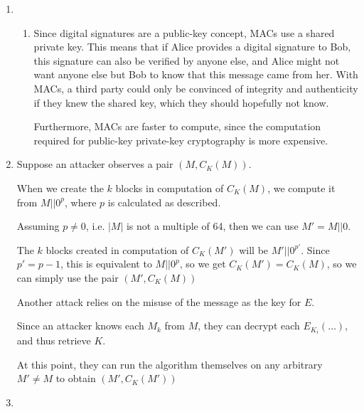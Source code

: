 


\begin{enumerate}[label=(\alph*)]

  \item
    \begin{enumerate}[label=(\roman*)]

      \item

        Since digital signatures are a public-key concept, MACs use a shared private key. This means that if Alice provides a digital signature to Bob, this signature can also be verified by anyone else, and Alice might not want anyone else but Bob to know that this message came from her. With MACs, a third party could only be convinced of integrity and authenticity if they knew the shared key, which they should hopefully not know.

        Furthermore, MACs are faster to compute, since the computation required for public-key private-key cryptography is more expensive.

        
    \end{enumerate}

    \item

      Suppose an attacker observes a pair $(M, C_K(M))$.

      When we create the $k$ blocks in computation of $C_K(M)$, we compute it from $M||0^p$, where $p$ is calculated as described.

      Assuming $p \neq 0$, i.e. $|M|$ is not a multiple of 64, then we can use $M' = M||0$.

      The $k$ blocks created in computation of $C_K(M')$ will be $M'||0^{p'}$. Since $p' = p-1$, this is equivalent to $M||0^p$, so we get $C_K(M') = C_K(M)$, so we can simply use the pair $(M', C_K(M))$

      \vspace{15pt}

      Another attack relies on the misuse of the message as the key for $E$.

      Since an attacker knows each $M_k$ from $M$, they can decrypt each $E_{K_i}(\ldots)$, and thus retrieve $K$.

      At this point, they can run the algorithm themselves on any arbitrary $M' \neq M$ to obtain $(M', C_K(M'))$

      \item
        \begin{enumerate}[label=(\roman*)]


\end{enumerate}
\end{enumerate}
